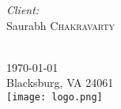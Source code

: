 \begin{titlepage}
\begin{minipage}{0.4\textwidth}
\begin{flushright}
\emph{Client:} \\
Saurabh \textsc{Chakravarty}
\end{flushright}
\end{minipage}\\[1.5cm]


{\large \today} \\ %
{\small Blacksburg, VA 24061} \\[0.5cm]


\texttt{[image: logo.png]}\\[1cm]
 

\vfill %

\end{titlepage}

